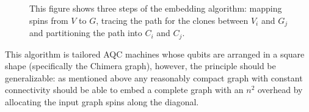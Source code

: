 \begin{figure}
	\caption[Embedding Algorithm]{This figure shows three steps of the embedding algorithm: mapping spins from $V$ to $G$, tracing the path for the clones between $V_i$ and $G_j$ and partitioning the path into $C_i$ and $C_j$.}
	\label{fig:embedding}
\end{figure}

This algorithm is tailored AQC machines whose qubits are arranged in a square shape (specifically the Chimera graph), however, the principle should be generalizable: as mentioned above any reasonably compact graph with constant connectivity should be able to embed a complete graph with an $n^2$ overhead by allocating the input graph spins along the diagonal.
